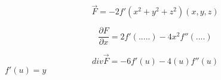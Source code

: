 $$\overrightarrow F = -2 f'(x^2 + y^2 + z^2)(x,y,z)$$

$$\frac{\partial F}{\partial x} = 2f'(.....) -4 x^2 f''(....)$$

$$div \overrightarrow{F} = -6 f'(u) -4(u) f''(u)$$
$f'(u) = y$